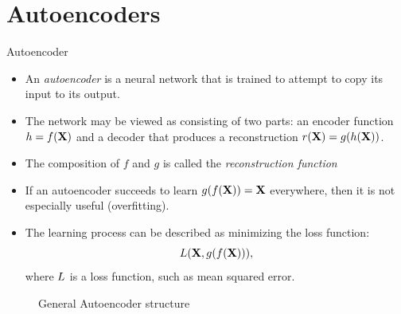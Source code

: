 \documentclass[xcolor=pdftex,dvipsnames,table,mathserif]{beamer}
\begin{document}
\section{Autoencoders}
\begin{frame}{Autoencoder}
\begin{itemize}
\item An \emph{autoencoder} is a neural network that is trained to attempt to copy its input to its output.
\item The network may be viewed as consisting of two parts: an
encoder function $h = f (\mathbf{X})$ and a decoder that produces a reconstruction $r(\mathbf{X}) = g(h(\mathbf{X}))$.
\item The composition of $f$ and $g$ is called the \emph{reconstruction function}
\item If an autoencoder succeeds to learn $g(f (\mathbf{X})) = \mathbf{X}$ everywhere, then it is not especially useful (overfitting).
\item The learning process can be described as minimizing the loss function:
\begin{equation}
L ( \mathbf{X} , g(f(\mathbf{X}))),
\end{equation}
where $L$ is a loss function, such as mean squared error.
\end{itemize}
\begin{figure}
\centering
{}
  \caption{General Autoencoder structure}
\end{figure}
\end{frame}
\end{document}
